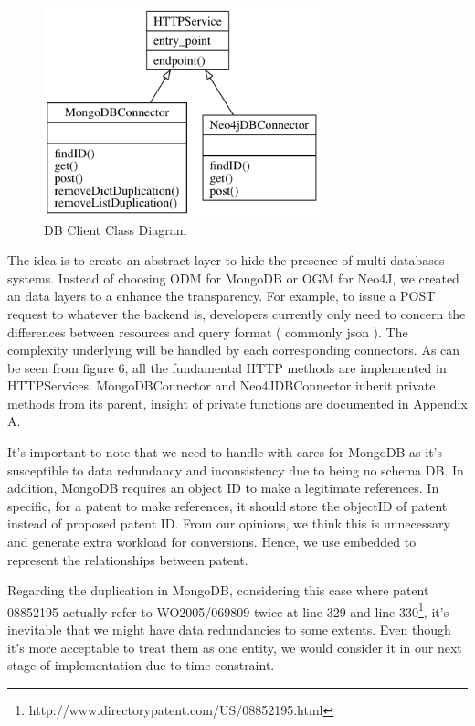 \documentclass{sig-alternate}
\begin{document}
{\begin{figure}[htb]
\centering
\includegraphics[width=80mm,scale=10]{db_client.png}
\caption{ DB Client Class Diagram}
\end{figure}

The idea is to create an abstract layer to hide the presence of multi-databases systems. Instead of choosing ODM for MongoDB or OGM for Neo4J, we created an data layers to a enhance the transparency. For example, to issue a POST request to whatever the backend is, developers currently only need to concern the differences between resources and query format ( commonly json ). The complexity underlying will be handled by each corresponding connectors. As can be seen from figure 6, all the fundamental HTTP methods are implemented in HTTPServices. MongoDBConnector and Neo4JDBConnector inherit private methods from its parent, insight of private functions are documented in Appendix A. 

It's important to note that we need to handle with cares for MongoDB as it's susceptible to data redundancy and inconsistency due to being no schema DB. In addition, MongoDB requires an object ID to make a legitimate references. In specific, for a patent to make references, it should store the objectID of patent instead of proposed patent ID. From our opinions, we think this is unnecessary and generate extra workload for conversions. Hence, we use embedded to represent the relationships between patent. 

Regarding the duplication in MongoDB, considering this case where patent 08852195 actually refer to WO2005/069809 twice at line 329 and line 330\footnote{http://www.directorypatent.com/US/08852195.html}, it's inevitable that we might have data redundancies to some extents. Even though it's more acceptable to treat them as one entity, we would consider it in our next stage of implementation due to time constraint.

}
\end{document}
